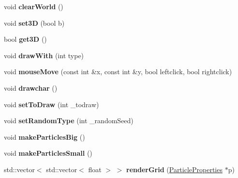 \begin{DoxyCompactItemize}
\item 
\hypertarget{classWorld_aa6e788d15f389d634ccd1148f47cfb96}{void {\bfseries clear\-World} ()}\label{classWorld_aa6e788d15f389d634ccd1148f47cfb96}

\item 
\hypertarget{classWorld_a464e5e41c3cf428b4ac97b67c826c8eb}{void {\bfseries set3\-D} (bool b)}\label{classWorld_a464e5e41c3cf428b4ac97b67c826c8eb}

\item 
\hypertarget{classWorld_a561567c6a539a240f3ed54ff228f5271}{bool {\bfseries get3\-D} ()}\label{classWorld_a561567c6a539a240f3ed54ff228f5271}

\item 
\hypertarget{classWorld_a7eb707b21072c77214420804e662d906}{void {\bfseries draw\-With} (int type)}\label{classWorld_a7eb707b21072c77214420804e662d906}

\item 
\hypertarget{classWorld_a0cd51e0a2125d62aa76c29359785e0f5}{void {\bfseries mouse\-Move} (const int \&x, const int \&y, bool leftclick, bool rightclick)}\label{classWorld_a0cd51e0a2125d62aa76c29359785e0f5}

\item 
\hypertarget{classWorld_a6fcdae48d4867a7f42d7c49c57433ab3}{void {\bfseries drawchar} ()}\label{classWorld_a6fcdae48d4867a7f42d7c49c57433ab3}

\item 
\hypertarget{classWorld_a2306bf46e36020f35a7d3bc2527434fb}{void {\bfseries set\-To\-Draw} (int \-\_\-todraw)}\label{classWorld_a2306bf46e36020f35a7d3bc2527434fb}

\item 
\hypertarget{classWorld_aadab7988ffe1e55c10ad34f85199e385}{void {\bfseries set\-Random\-Type} (int \-\_\-random\-Seed)}\label{classWorld_aadab7988ffe1e55c10ad34f85199e385}

\item 
\hypertarget{classWorld_a37363e2d9fb17fa31691af105c6e6a8c}{void {\bfseries make\-Particles\-Big} ()}\label{classWorld_a37363e2d9fb17fa31691af105c6e6a8c}

\item 
\hypertarget{classWorld_a0c111bf57420a13120baca933b9f250f}{void {\bfseries make\-Particles\-Small} ()}\label{classWorld_a0c111bf57420a13120baca933b9f250f}

\item 
\hypertarget{classWorld_a4967d249f71084117a4b6a84a58dba9f}{std\-::vector$<$ std\-::vector$<$ float $>$ $>$ {\bfseries render\-Grid} (\hyperlink{classParticleProperties}{Particle\-Properties} $\ast$p)}\label{classWorld_a4967d249f71084117a4b6a84a58dba9f}


\end{DoxyCompactItemize}
